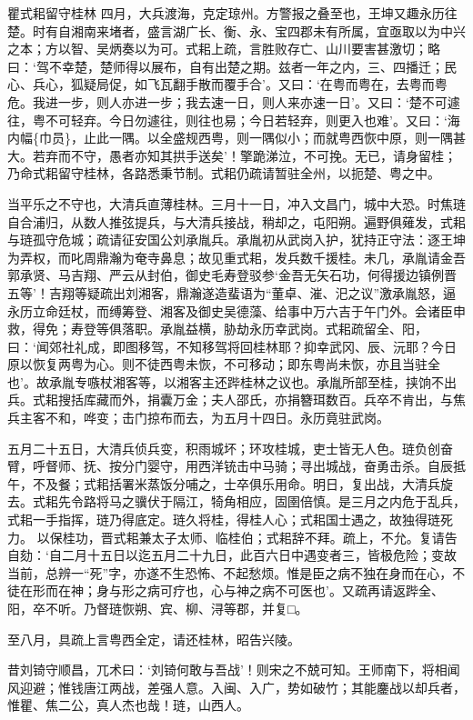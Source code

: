 \documentclass[]{article}
\begin{document}
瞿式耜留守桂林
四月，大兵渡海，克定琼州。方警报之叠至也，王坤又趣永历往楚。时有自湘南来堵者，盛言湖广长、衡、永、宝四郡未有所属，宜亟取以为中兴之本；方以智、吴炳奏以为可。式耜上疏，言胜败存亡、山川要害甚激切；略曰：`驾不幸楚，楚师得以展布，自有出楚之期。兹者一年之内，三、四播迁；民心、兵心，狐疑局促，如飞瓦翻手散而覆手合'。又曰：`在粤而粤在，去粤而粤危。我进一步，则人亦进一步；我去速一日，则人来亦速一日'。又曰：`楚不可遽往，粤不可轻弃。今日勿遽往，则往也易；今日若轻弃，则更入也难'。又曰：`海内幅\{巾员\}，止此一隅。以全盛规西粤，则一隅似小；而就粤西恢中原，则一隅甚大。若弃而不守，愚者亦知其拱手送矣'！擎跪涕泣，不可挽。无已，请身留桂；乃命式耜留守桂林，各路悉秉节制。式耜仍疏请暂驻全州，以扼楚、粤之中。

当平乐之不守也，大清兵直薄桂林。三月十一日，冲入文昌门，城中大恐。时焦琏自合浦归，从数人推弦提兵，与大清兵接战，稍却之，屯阳朔。遍野俱薙发，式耜与琏孤守危城；疏请征安国公刘承胤兵。承胤初从武岗入护，犹持正守法：逐王坤为弄权，而叱周鼎瀚为奄寺鼻息；故见重式耜，发兵数千援桂。未几，承胤请金吾郭承贤、马吉翔、严云从封伯，御史毛寿登驳参`金吾无矢石功，何得援边镇例晋五等'！吉翔等疑疏出刘湘客，鼎瀚遂造蜚语为``董卓、漼、汜之议''激承胤怒，逼永历立命廷杖，而缚筹登、湘客及御史吴德藻、给事中万六吉于午门外。会诸臣申救，得免；寿登等俱落职。承胤益横，胁劫永历幸武岗。式耜疏留全、阳，曰：`闻郊社礼成，即图移驾，不知移驾将回桂林耶？抑幸武冈、辰、沅耶？今日原以恢复两粤为心。则不徒西粤未恢，不可移动；即东粤尚未恢，亦且当驻全也'。故承胤专嗾杖湘客等，以湘客主还跸桂林之议也。承胤所部至桂，挟饷不出兵。式耜搜括库藏而外，捐囊万金；夫人邵氏，亦捐簪珥数百。兵卒不肯出，与焦兵主客不和，哗变；击门掠布而去，为五月十四日。永历竟驻武岗。

五月二十五日，大清兵侦兵变，积雨城坏；环攻桂城，吏士皆无人色。琏负创奋臂，呼督师、抚、按分门婴守，用西洋铳击中马骑；寻出城战，奋勇击杀。自辰抵午，不及餐；式耜括署米蒸饭分哺之，士卒俱乐用命。明日，复出战，大清兵旋去。式耜先令路将马之骥伏于隔江，犄角相应，固圉倍慎。是三月之内危于乱兵，式耜一手指挥，琏乃得底定。琏久将桂，得桂人心；式耜国士遇之，故独得琏死力。
以保桂功，晋式耜兼太子太师、临桂伯；式耜辞不拜。疏上，不允。复请告自劾：`自二月十五日以迄五月二十九日，此百六日中遇变者三，皆极危险；变故当前，总辨一``死''字，亦遂不生恐怖、不起愁烦。惟是臣之病不独在身而在心，不徒在形而在神；身与形之病可疗也，心与神之病不可医也'。又疏再请返跸全、阳，卒不听。乃督琏恢朔、宾、柳、浔等郡，并复□。

至八月，具疏上言粤西全定，请还桂林，昭告兴陵。

昔刘锜守顺昌，兀术曰：`刘锜何敢与吾战'！则宋之不兢可知。王师南下，将相闻风迎避；惟钱唐江两战，差强人意。入闽、入广，势如破竹；其能鏖战以却兵者，惟瞿、焦二公，真人杰也哉！琏，山西人。
\end{document}

